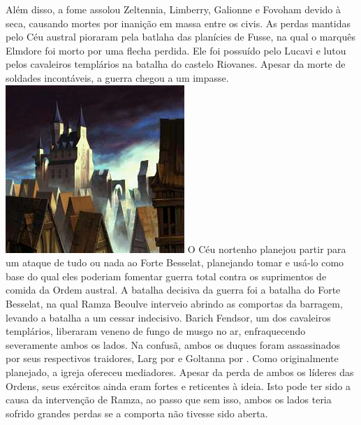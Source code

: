 Além disso, a fome assolou Zeltennia, Limberry, Galionne e Fovoham devido à seca, causando mortes por inanição em massa entre os civis.
As perdas mantidas pelo Céu austral pioraram pela batlaha das planícies de Fusse, na qual o marquês Elmdore foi morto por uma flecha perdida.
Ele foi possuído pelo Lucavi  e lutou pelos cavaleiros templários na batalha do castelo Riovanes.
Apesar da morte de soldades incontáveis, a guerra chegou a um impasse.
%
\ofpar
\includegraphics[width=\columnwidth]{./art/worldbook/riovanes.jpg}
\ofpar
% 
O Céu nortenho planejou partir para um ataque de tudo ou nada ao Forte Besselat, planejando tomar e usá-lo como base do qual eles poderiam fomentar guerra total contra os suprimentos de comida da Ordem austral.
A batalha decisiva da guerra foi a batalha do Forte Besselat, na qual Ramza Beoulve interveio abrindo as comportas da barragem, levando a batalha a um cessar indecisivo. 
Barich Fendsor, um dos cavaleiros templários, liberaram veneno de fungo de musgo no ar, enfraquecendo severamente ambos os lados.
Na confusã, ambos os duques foram assassinados por seus respectivos traidores, Larg por  e Goltanna por .
Como originalmente planejado, a igreja ofereceu mediadores.
Apesar da perda de ambos os líderes das Ordens, seus exércitos ainda eram fortes e reticentes à ideia.
Isto pode ter sido a causa da intervenção de Ramza, ao passo que sem isso, ambos os lados teria sofrido grandes perdas se a comporta não tivesse sido aberta.
